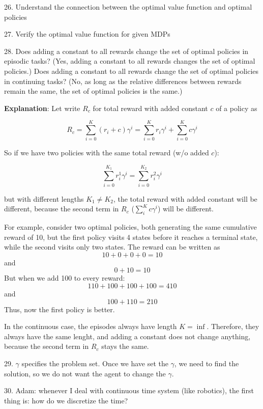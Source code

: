 \documentclass[sutton_barto_notes.tex]{subfiles}
\begin{document}
26. Understand the connection between the optimal value function and optimal policies

27. Verify the optimal value function for given MDPs

28. Does adding a constant to all rewards change the set of optimal policies in episodic tasks? (Yes, adding a constant to all rewards changes the set of optimal policies.)
Does adding a constant to all rewards change the set of optimal policies in continuing tasks? (No, as long as the relative differences between rewards remain the same, the set of optimal policies is the same.)

\textbf{Explanation}: Let write $R_c$ for total reward with added constant $c$ of a policy as

$$ R_c = \sum_{i=0}^K (r_i + c) \gamma^i = \sum_{i=0}^K r_i \gamma^i + \sum_{i=0}^K c \gamma^i $$

So if we have two policies with the same total reward (w/o added $c$):

$$ \sum_{i=0}^{K_1} r_i^1\gamma^i = \sum_{i=0}^{K_2} r_i^2 \gamma^i $$

but with different lengths $K_1 \neq K_2$, the total reward with added constant will be different, because the second term in $R_c$ ($\sum_i^K c\gamma^i$) will be different.

For example, consider two optimal policies, both generating the same cumulative reward of 10, but the first policy visits 4 states before it reaches a terminal state, while the second visits only two states. The reward can be written as
$$ 10 + 0 + 0 + 0 = 10 $$
and
$$0+10=10$$
But when we add 100 to every reward:
$$ 110+100+100+100=410$$
and
$$100+110=210$$
Thus, now the first policy is better.

In the continuous case, the episodes always have length $K=\inf$. Therefore, they always have the same lenght, and adding a constant does not change anything, because the second term in $R_c$ stays the same.

29. $\gamma$ specifies the problem set. Once we have set the $\gamma$, we need to find the solution, so we do not want the agent to change the $\gamma$.

30. Adam: whenever I deal with continuous time system (like robotics), the first thing is: how do we discretize the time?
\end{document}
